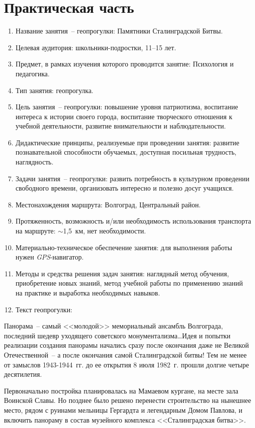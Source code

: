 \section*{Практическая часть}
\begin{enumerate}
  \item Название занятия~-- геопрогулки: Памятники Сталинградской Битвы.
  \item Целевая аудитория: школьники-подростки, 11--15 лет.
  \item Предмет, в рамках изучения которого проводится занятие: Психология и
    педагогика.
  \item Тип занятия: геопрогулка.
  \item Цель занятия~-- геопрогулки: повышение уровня патриотизма, воспитание
    интереса к истории своего города, воспитание творческого отношения к учебной
    деятельности, развитие внимательности и наблюдательности.
  \item Дидактические принципы, реализуемые при проведении занятия: развитие
    познавательной способности обучаемых, доступная посильная трудность,
    наглядность.
  \item Задачи занятия~-- геопрогулки: развить потребность в культурном
    проведении свободного времени, организовать интересно и полезно досуг
    учащихся.
  \item Местонахождения маршрута: Волгоград, Центральный район.
  \item Протяженность, возможность и/или необходимость использования транспорта
    на маршруте: \( \sim \)1,5~км, нет необходимости.
  \item Материально-техническое обеспечение занятия: для выполнения работы нужен
    \emph{GPS}-навигатор.
  \item Методы и средства решения задач занятия: наглядный метод обучения,
    приобретение новых знаний, метод учебной работы по применению знаний на
    практике и выработка необходимых навыков.
  \item Текст геопрогулки:
\end{enumerate}
  
Панорама~-- самый <<молодой>> мемориальный ансамбль Волгограда, последний
шедевр уходящего советского монументализма\ldots Идея и попытки реализации
создания панорамы начались сразу после окончания даже не Великой
Отечественной~-- а после окончания самой Сталинградской битвы! Тем не менее от
замыслов 1943-1944~гг. до ее открытия 8 июля 1982~г. прошли долгие четыре
десятилетия.

Первоначально постройка планировалась на Мамаевом кургане, на месте зала
Воинской Славы. Но позднее было решено перенести строительство на нынешнее
место, рядом с руинами мельницы Гергардта и легендарным Домом Павлова, и
включить панораму в состав музейного комплекса <<Сталинградская битва>>.

